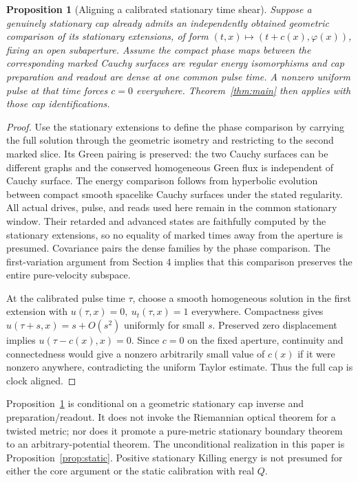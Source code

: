 \documentclass[11pt]{article}
\numberwithin{equation}{section}
\newtheorem{proposition}[theorem]{Proposition}
\begin{document}
\begin{proposition}[Aligning a calibrated stationary time shear]\label{prop:shear}
Suppose a genuinely stationary cap already admits an independently obtained geometric comparison of its stationary extensions, of form \((t,x)\mapsto(t+c(x),\varphi(x))\), fixing an open subaperture. Assume the compact phase maps between the corresponding marked Cauchy surfaces are regular energy isomorphisms and cap preparation and readout are dense at one common pulse time. A nonzero uniform pulse at that time forces \(c=0\) everywhere. Theorem~\ref{thm:main} then applies with those cap identifications.
\end{proposition}

\begin{proof}
Use the stationary extensions to define the phase comparison by carrying the full solution through the geometric isometry and restricting to the second marked slice. Its Green pairing is preserved: the two Cauchy surfaces can be different graphs and the conserved homogeneous Green flux is independent of Cauchy surface. The energy comparison follows from hyperbolic evolution between compact smooth spacelike Cauchy surfaces under the stated regularity. All actual drives, pulse, and reads used here remain in the common stationary window. Their retarded and advanced states are faithfully computed by the stationary extensions, so no equality of marked times away from the aperture is presumed. Covariance pairs the dense families by the phase comparison. The first-variation argument from Section 4 implies that this comparison preserves the entire pure-velocity subspace.

At the calibrated pulse time \(\tau\), choose a smooth homogeneous solution in the first extension with \(u(\tau,x)=0,\ u_t(\tau,x)=1\) everywhere. Compactness gives \(u(\tau+s,x)=s+O(s^2)\) uniformly for small \(s\). Preserved zero displacement implies \(u(\tau-c(x),x)=0\). Since \(c=0\) on the fixed aperture, continuity and connectedness would give a nonzero arbitrarily small value of \(c(x)\) if it were nonzero anywhere, contradicting the uniform Taylor estimate. Thus the full cap is clock aligned.
\end{proof}

Proposition~\ref{prop:shear} is conditional on a geometric stationary cap inverse and preparation/readout. It does not invoke the Riemannian optical theorem for a twisted metric; nor does it promote a pure-metric stationary boundary theorem to an arbitrary-potential theorem. The unconditional realization in this paper is Proposition~\ref{prop:static}. Positive stationary Killing energy is not presumed for either the core argument or the static calibration with real \(Q\).
\end{document}
